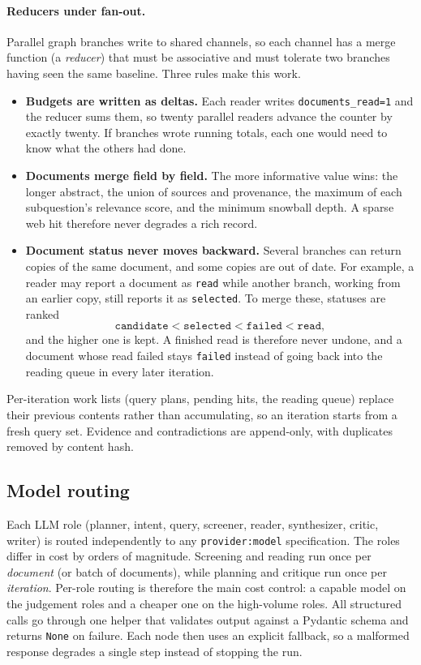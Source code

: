 \documentclass{article}
\newcommand{\code}[1]{\texttt{#1}}
\begin{document}
\paragraph{Reducers under fan-out.}
Parallel graph branches write to shared channels, so each channel has a
merge function (a \emph{reducer}) that must be associative and must
tolerate two branches having seen the same baseline. Three rules make this
work.

\begin{itemize}[leftmargin=*]
  \item \textbf{Budgets are written as deltas.} Each reader writes
    \code{documents\_read=1} and the reducer sums them, so twenty parallel
    readers advance the counter by exactly twenty. If branches wrote
    running totals, each one would need to know what the others had done.
  \item \textbf{Documents merge field by field.} The more informative value
    wins: the longer abstract, the union of sources and provenance, the
    maximum of each subquestion's relevance score, and the minimum
    snowball depth. A sparse web hit therefore never degrades a rich
    record.
  \item \textbf{Document status never moves backward.} Several branches
    can return copies of the same document, and some copies are out of
    date. For example, a reader may report a document as \code{read}
    while another branch, working from an earlier copy, still reports it
    as \code{selected}. To merge these, statuses are ranked
    \[
      \texttt{candidate} < \texttt{selected}
      < \texttt{failed} < \texttt{read},
    \]
    and the higher one is kept. A finished read is therefore never
    undone, and a document whose read failed stays \code{failed} instead
    of going back into the reading queue in every later iteration.
\end{itemize}

Per-iteration work lists (query plans, pending hits, the reading queue)
replace their previous contents rather than accumulating, so an iteration
starts from a fresh query set. Evidence and contradictions are append-only,
with duplicates removed by content hash.

\subsection{Model routing}

Each LLM role (planner, intent, query, screener, reader, synthesizer,
critic, writer) is routed independently to any \code{provider:model}
specification. The roles differ in cost by orders of magnitude. Screening
and reading run once per \emph{document} (or batch of documents), while planning
and critique run once per \emph{iteration}. Per-role routing is therefore
the main cost control: a capable model on the judgement roles and a cheaper
one on the high-volume roles. All structured calls go through one helper
that validates output against a Pydantic schema and returns \code{None} on
failure. Each node then uses an explicit fallback, so a malformed response
degrades a single step instead of stopping the run.
\end{document}
